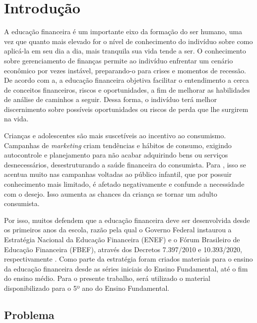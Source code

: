 \chapter{Introdução}

    A educação financeira é um importante eixo da formação do ser humano, uma vez que quanto mais elevado for o nível de
    conhecimento do indivíduo sobre como aplicá-la em seu dia a dia, mais tranquila sua vida tende a ser. O conhecimento
    sobre gerenciamento de finanças permite ao indivíduo enfrentar um cenário econômico por vezes instável, preparando-o
    para crises e momentos de recessão. De acordo com a, a educação financeira objetiva facilitar o
    entendimento a cerca de conceitos financeiros, riscos e oportunidades, a fim de melhorar as habilidades de análise
    de caminhos a seguir. Dessa forma, o indivíduo terá melhor discernimento sobre possíveis oportunidades ou riscos de
    perda que lhe surgirem na vida.

    Crianças e adolescentes são mais suscetíveis ao incentivo ao consumismo. Campanhas de \textit{marketing} criam
    tendências e hábitos de consumo, exigindo autocontrole e planejamento para não acabar adquirindo bens ou serviços
    desnecessários, desestruturando a saúde financeira do consumista.
    Para , isso se acentua muito nas campanhas voltadas ao público
    infantil, que por possuir conhecimento mais limitado, é afetado negativamente e confunde a necessidade com o desejo.
    Isso aumenta as chances da criança se tornar um adulto consumista.

    Por isso, muitos defendem que a educação financeira deve ser desenvolvida desde os primeiros anos da escola, razão
    pela qual o Governo Federal instaurou a Estratégia Nacional da Educação Financeira (ENEF) e o Fórum Brasileiro de
    Educação Financeira (FBEF), através dos Decretos 7.397/2010 e 10.393/2020, respectivamente \cite{decreto_10939}.
    Como parte da estratégia foram criados materiais para o ensino da educação financeira desde as séries iniciais do
    Ensino Fundamental, até o fim do ensino médio. Para o presente trabalho, será utilizado o material disponibilizado
    para o 5º ano do Ensino Fundamental\cite{Educacao_financeira_nas_escolas}.

    \section{Problema}

